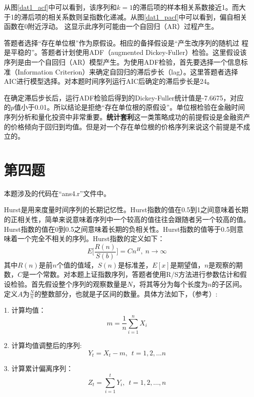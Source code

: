 \documentclass[11pt]{article}
\begin{document}
从图\ref{dat1_acf}中可以看到，该序列和$k=1$的滞后项的样本相关系数接近1。而大于1的滞后项的相关系数则呈指数化递减。从图\ref{dat1_pacf}中可以看到，偏自相关函数在0附近浮动。 这显示此序列可能由一个自回归（AR）过程产生。

答题者选择“存在单位根”作为原假设。相应的备择假设是“产生改序列的随机过 程是平稳的”。答题者计划使用ADF（augmented Dickey-Fuller）检验。这里假设该序列是由一个自回归（AR）模型产生。为使用ADF检验，首先要选择一个信息标准（Information Criterion）来确定自回归的滞后步长（lag）。这里答题者选择AIC进行模型选择。对本题时间序列运行AIC后确定的滞后步长是24。

在确定滞后步长后，运行ADF检验后得到的Dickey-Fuller统计值是-7.6675，对应的$p$值小于0.01。所以结论是拒绝“存在单位根的原假设”。单位根检验在金融时间序列分析和量化投资中非常重要。\textbf{统计套利}这一类策略成功的前提假设是金融资产的价格倾向于回归到均值。但是对一个存在单位根的价格序列来说这个前提是不成立的。


\section*{第四题}
本题涉及的代码在“ans4.r”文件中。

Hurst是用来度量时间序列的长期记忆性。Hurst指数的值在0.5到1之间意味着长期的正相关性，简单来说意味着序列中一个较高的值往往会跟随者另一个较高的值。Hurst指数的值在0到0.5之间意味着长期的负相关性。Hurst指数的值等于0.5则意味着一个完全不相关的序列。Hurst指数的定义如下：
\begin{equation}
E\bigg[\frac{R(n)}{S(b)}\bigg]=Cn^H,\ n \rightarrow \infty
\end{equation}
其中$R(n)$是前$n$个值的值域，$S(n)$是标准差，$E[x]$是期望值，$n$是观察的期数，$C$是一个常数。对本题上证指数序列，答题者使用R/S方法进行参数估计和假设检验。首先假设整个序列的观察数量是$N$，将其等分为每个长度为$n$的子区间。定义$A$为$\frac{N}{n}$的整数部分，也就是子区间的数量。具体方法如下，（参考\cite{Qian2004}）:

1. 计算均值：
\begin{equation}
m=\frac{1}{n}\sum\limits_{i=1}^{n}X_i
\end{equation}

2. 计算均值调整后的序列:
\begin{equation}
Y_t = X_t -m, \ \ t=1,2,...n
\end{equation}

3. 计算累计偏离序列：
\begin{equation}
Z_t = \sum\limits_{i=1}^{t} Y_i, \ \ t=1,2,...,n
\end{equation}
\end{document}
